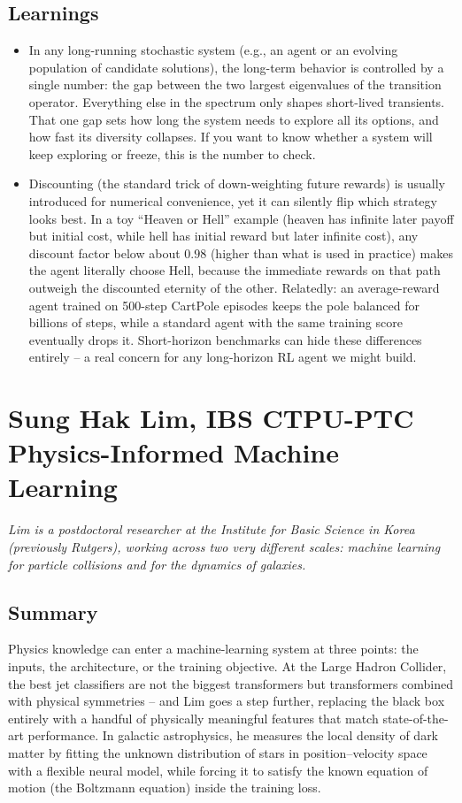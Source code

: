 \documentclass[11pt]{article}
\begin{document}
\subsection*{Learnings}
\begin{itemize}
    \item In any long-running stochastic system (e.g., an agent or an evolving population of candidate solutions), the long-term behavior is controlled by a single number: the gap between the two largest eigenvalues of the transition operator. Everything else in the spectrum only shapes short-lived transients. That one gap sets how long the system needs to explore all its options, and how fast its diversity collapses. If you want to know whether a system will keep exploring or freeze, this is the number to check.
    \item Discounting (the standard trick of down-weighting future rewards) is usually introduced for numerical convenience, yet it can silently flip which strategy looks best. In a toy ``Heaven or Hell'' example (heaven has infinite later payoff but initial cost, while hell has initial reward but later infinite cost), any discount factor below about $0.98$ (higher than what is used in practice) makes the agent literally choose Hell, because the immediate rewards on that path outweigh the discounted eternity of the other. Relatedly: an average-reward agent trained on 500-step CartPole episodes keeps the pole balanced for billions of steps, while a standard agent with the same training score eventually drops it. Short-horizon benchmarks can hide these differences entirely -- a real concern for any long-horizon RL agent we might build.
\end{itemize}

\section{Sung Hak Lim, IBS CTPU-PTC\\
{\large Physics-Informed Machine Learning}}

\emph{Lim is a postdoctoral researcher at the Institute for Basic Science in Korea (previously Rutgers), working across two very different scales: machine learning for particle collisions and for the dynamics of galaxies.}

\subsection*{Summary}
Physics knowledge can enter a machine-learning system at three points: the inputs, the architecture, or the training objective. At the Large Hadron Collider, the best jet classifiers are not the biggest transformers but transformers combined with physical symmetries -- and Lim goes a step further, replacing the black box entirely with a handful of physically meaningful features that match state-of-the-art performance. In galactic astrophysics, he measures the local density of dark matter by fitting the unknown distribution of stars in position--velocity space with a flexible neural model, while forcing it to satisfy the known equation of motion (the Boltzmann equation) inside the training loss.
\end{document}
